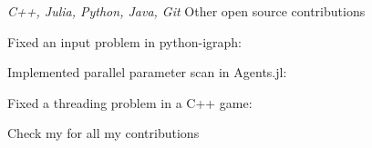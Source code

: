 \begin{cventries}
  \cventry
    {\emph{C++, Julia, Python, Java, Git}} %
    {Other open source contributions} %
    {} %
    {} %
    {
      \begin{cvitems} %
        \item{Fixed an input problem in python-igraph: \href{https://github.com/igraph/python-igraph/pull/618}{\underline{}}}
        \item{Implemented parallel parameter scan in Agents.jl: \href{https://github.com/JuliaDynamics/Agents.jl/pull/484}{\underline{}}}
        \item{Fixed a threading problem in a C++ game: \href{https://github.com/vcmi/vcmi/pull/1868}{\underline{}}}
        \item{Check my \href{https://github.com/pulls?q=is\%3Apr+archived\%3Afalse+is\%3Aclosed+author\%3AAdriankhl}{\underline{}} for all my contributions}
      \end{cvitems}
    }


\end{cventries}
